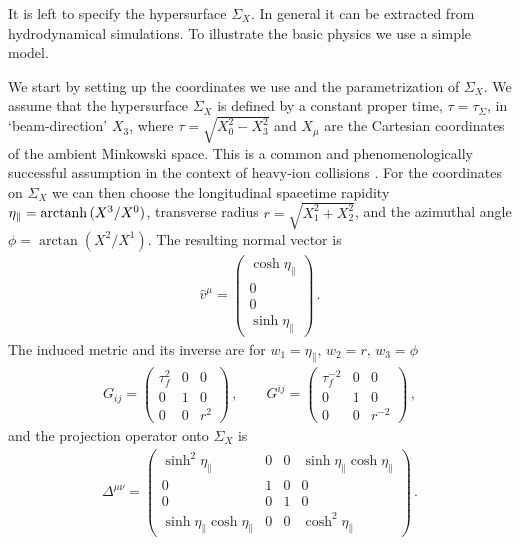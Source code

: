 \documentclass[reprint,superscriptaddress,english,preprintnumbers,amsmath,amssymb,aps,prx]{revtex4-2}
\begin{document}
It is left to specify the hypersurface $\Sigma_X$. 
In general it can be extracted from hydrodynamical simulations. To illustrate the basic physics we use a simple model.

We start by setting up the coordinates we use and the parametrization of $\Sigma_X$.
We assume that the hypersurface $\Sigma_X$ is defined by a constant proper time, $\tau = \tau_\Sigma$, in `beam-direction' $X_3$, where $\tau = \sqrt{X_0^2-X_3^2}$ and $X_\mu$ are the Cartesian coordinates of the ambient Minkowski space. This is a common and phenomenologically successful assumption in the context of heavy-ion collisions \cite{Florkowski:2010zz}. 
For the coordinates on $\Sigma_X$ we can then choose the longitudinal spacetime rapidity $\eta_\parallel = {\rm arctanh}\,(X^3/X^0)$, transverse radius $r = \sqrt{X_1^2+X_2^2}$, and the azimuthal angle $\phi = \arctan (X^2/X^1)$.
The resulting normal vector is
\begin{align}
\hat v^\mu = \begin{pmatrix} \cosh\eta_\parallel \\ 0 \\ 0 \\ \sinh\eta_\parallel\end{pmatrix}\,.
\end{align}
The induced metric and its inverse are for $w_1 =\eta_\parallel,\,w_2=r,\,w_3=\phi$
\begin{align}
G_{ij} = \begin{pmatrix} \tau_f^2 & 0& 0 \\ 0 & 1 & 0 \\ 0 & 0 & r^2  \end{pmatrix}\,,\qquad
G^{ij} = \begin{pmatrix} \tau_f^{-2}& 0& 0 \\ 0 & 1 & 0 \\ 0 & 0 & r^{-2}  \end{pmatrix}\,,
\end{align}
and the projection operator onto $\Sigma_X$ is
\begin{align}
\Delta^{\mu\nu} = \begin{pmatrix} 
\sinh^2 \eta_\parallel & 0 & 0 & \sinh \eta_\parallel\cosh \eta_\parallel\\
0 & 1 & 0 & 0\\
0 & 0 & 1 & 0\\
\sinh \eta_\parallel\cosh \eta_\parallel & 0 & 0 & \cosh^2 \eta_\parallel
 \end{pmatrix}\,.
\end{align}
\end{document}
